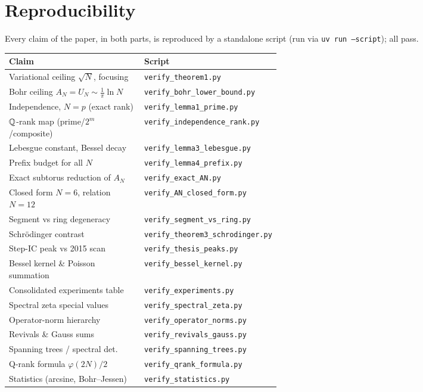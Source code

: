 \section{Reproducibility}\label{sec:repro}

Every claim of the paper, in both parts, is reproduced by a standalone script (run via \texttt{uv run --script}); all
pass.
\begin{longtable}{@{}p{0.53\linewidth}@{\hspace{0.6em}}l@{}}
\hline
Claim & Script \\
\hline
\endhead
\hline
\endfoot
Variational ceiling $\sqrt N$, focusing & \texttt{verify\_theorem1.py}\\
Bohr ceiling $A_N=U_N\sim\frac1\pi\ln N$ & \texttt{verify\_bohr\_lower\_bound.py}\\
Independence, $N=p$ (exact rank) & \texttt{verify\_lemma1\_prime.py}\\
$\mathbb{Q}$-rank map (prime/$2^m$/composite) & \texttt{verify\_independence\_rank.py}\\
Lebesgue constant, Bessel decay & \texttt{verify\_lemma3\_lebesgue.py}\\
Prefix budget for all $N$ & \texttt{verify\_lemma4\_prefix.py}\\
Exact subtorus reduction of $A_N$ & \texttt{verify\_exact\_AN.py}\\
Closed form $N=6$, relation $N=12$ & \texttt{verify\_AN\_closed\_form.py}\\
Segment vs ring degeneracy & \texttt{verify\_segment\_vs\_ring.py}\\
Schr\"odinger contrast & \texttt{verify\_theorem3\_schrodinger.py}\\
Step-IC peak vs 2015 scan & \texttt{verify\_thesis\_peaks.py}\\
Bessel kernel \& Poisson summation & \texttt{verify\_bessel\_kernel.py}\\
Consolidated experiments table & \texttt{verify\_experiments.py}\\
Spectral zeta special values & \texttt{verify\_spectral\_zeta.py}\\
Operator-norm hierarchy & \texttt{verify\_operator\_norms.py}\\
Revivals \& Gauss sums & \texttt{verify\_revivals\_gauss.py}\\
Spanning trees / spectral det.\ & \texttt{verify\_spanning\_trees.py}\\
Q-rank formula $\varphi(2N)/2$ & \texttt{verify\_qrank\_formula.py}\\
Statistics (arcsine, Bohr--Jessen) & \texttt{verify\_statistics.py}\\

\end{longtable}
